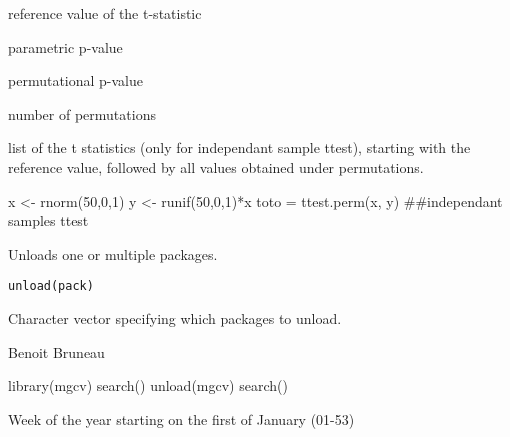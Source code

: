 \documentclass[a4paper]{book}
\begin{document}
%
\begin{Value}
\begin{ldescription}
\item[\code{t.ref }] reference value of the t-statistic
\item[\code{p.param }] parametric p-value
\item[\code{p.perm }] permutational p-value
\item[\code{nperm }] number of permutations
\item[\code{perm.t }] list of the t statistics (only for independant sample ttest), starting with the reference value, followed by all values obtained under permutations.
\end{ldescription}
\end{Value}
%
\begin{Examples}
\begin{ExampleCode}
x <- rnorm(50,0,1)
y <- runif(50,0,1)*x
toto = ttest.perm(x, y)  ##independant samples ttest
\end{ExampleCode}
\end{Examples}
\newpage
{}
%
\begin{Description}\relax
Unloads one or multiple packages.
\end{Description}
%
\begin{Usage}
\begin{verbatim}
unload(pack)
\end{verbatim}
\end{Usage}
%
\begin{Arguments}
\begin{ldescription}
\item[\code{pack}] Character vector specifying which packages to unload.

\end{ldescription}
\end{Arguments}
%
\begin{Author}\relax
Benoit Bruneau
\end{Author}
%
\begin{Examples}
\begin{ExampleCode}
library(mgcv)
search()
unload(mgcv)
search()
\end{ExampleCode}
\end{Examples}
\newpage
{}
%
\begin{Description}\relax
 Week of the year starting on the first of January (01-53)
\end{Description}
\end{document}
